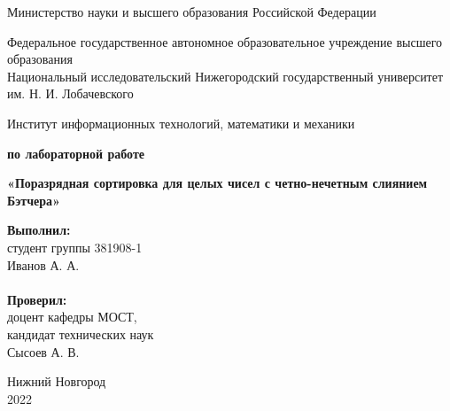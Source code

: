 \documentclass{report}
\begin{document}
\begin{titlepage}

\begin{center}
Министерство науки и высшего образования Российской Федерации
\end{center}

\begin{center}
Федеральное государственное автономное образовательное учреждение высшего образования \\
Национальный исследовательский Нижегородский государственный университет им. Н. И. Лобачевского
\end{center}

\begin{center}
Институт информационных технологий, математики и механики
\end{center}

\vspace{4em}

\begin{center}
\textbf{ по лабораторной работе} \\
\end{center}
\begin{center}
\textbf{\Large«Поразрядная сортировка для целых чисел с четно-нечетным слиянием Бэтчера»} \\
\end{center}

\vspace{4em}

\newbox{\lbox}
\newlength{\maxl}
\setlength{\maxl}{\wd\lbox}
\hfill\parbox{7cm}{
\hspace*{5cm}\hspace*{-5cm}\textbf{Выполнил:}
\\ студент группы 381908-1
\\ Иванов А. А.
\\\\
\hspace*{5cm}\hspace*{-5cm}\textbf{Проверил:}
\\ доцент кафедры МОСТ,
\\ кандидат технических наук
\\ Сысоев А. В.\\
}
\vspace{\fill}

\begin{center} Нижний Новгород \\ 2022 \end{center}

\end{titlepage}
\end{document}
